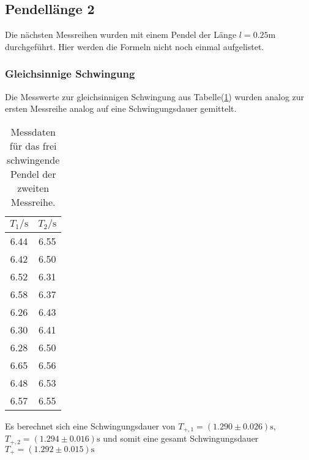     \subsection{Pendellänge 2}

        \noindent Die nächsten Messreihen wurden mit einem Pendel der Länge $l = 0.25 \si{\m}$ durchgeführt. Hier werden die Formeln 
        nicht noch einmal aufgelistet.

        \subsubsection{Gleichsinnige Schwingung}

            \noindent Die Messwerte zur gleichsinnigen Schwingung aus Tabelle(\ref{tab:frei2}) wurden analog zur ersten Messreihe analog auf 
            eine Schwingungsdauer gemittelt.

            \begin{table}[ht]
                \centering
                \caption{Messdaten für das frei schwingende Pendel der zweiten Messreihe.}
                \label{tab:frei2}
                \begin{tabular}{c c}
                 \toprule
                 $T_1 / \si{\s}$ & $T_2 / \si{\s}$\\
                 \midrule
                 6.44  &  6.55 \\
                 6.42  &  6.50 \\
                 6.52  &  6.31 \\
                 6.58  &  6.37 \\
                 6.26  &  6.43 \\
                 6.30  &  6.41 \\
                 6.28  &  6.50 \\
                 6.65  &  6.56 \\
                 6.48  &  6.53 \\
                 6.57  &  6.55 \\
                 \bottomrule
                \end{tabular}
            \end{table}
            
            \noindent Es berechnet sich eine Schwingungsdauer von $T_{+,1} = (1.290 \pm 0.026) \si{\second}$, $T_{+,2} = (1.294 \pm 0.016) \si{\second}$
            und somit eine gesamt Schwingungsdauer $T_+ = (1.292 \pm 0.015) \si{\second}$

